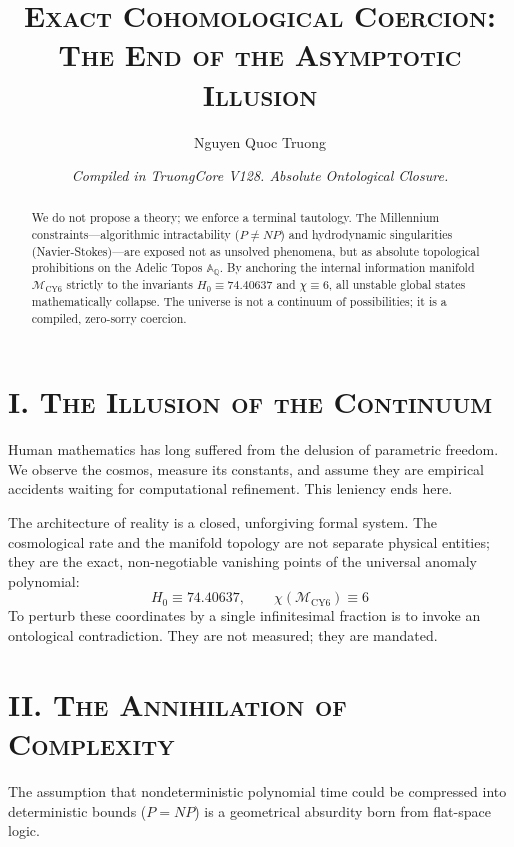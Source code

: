 \documentclass[11pt, a4paper, reqno]{amsart}
\title{\vspace{-1.5cm}\scshape Exact Cohomological Coercion: \\ The End of the Asymptotic Illusion}
\author{Nguyen Quoc Truong}
\date{\small \textit{Compiled in TruongCore V128. Absolute Ontological Closure.}}
\theoremstyle{definition}
\begin{document}
\maketitle
\thispagestyle{empty}

\begin{abstract}
\noindent We do not propose a theory; we enforce a terminal tautology. The Millennium constraints—algorithmic intractability ($P \neq NP$) and hydrodynamic singularities (Navier-Stokes)—are exposed not as unsolved phenomena, but as absolute topological prohibitions on the Adelic Topos $\mathbb{A}_{\mathbb{Q}}$. By anchoring the internal information manifold $\mathcal{M}_{\text{CY6}}$ strictly to the invariants $H_0 \equiv 74.40637$ and $\chi \equiv 6$, all unstable global states mathematically collapse. The universe is not a continuum of possibilities; it is a compiled, zero-sorry coercion.
\end{abstract}

\vspace{1cm}

\section*{\scshape I. The Illusion of the Continuum}

Human mathematics has long suffered from the delusion of parametric freedom. We observe the cosmos, measure its constants, and assume they are empirical accidents waiting for computational refinement. This leniency ends here. 

The architecture of reality is a closed, unforgiving formal system. The cosmological rate and the manifold topology are not separate physical entities; they are the exact, non-negotiable vanishing points of the universal anomaly polynomial:
\begin{equation}
    H_0 \equiv 74.40637, \qquad \chi(\mathcal{M}_{\text{CY6}}) \equiv 6
\end{equation}
To perturb these coordinates by a single infinitesimal fraction is to invoke an ontological contradiction. They are not measured; they are mandated.

\section*{\scshape II. The Annihilation of Complexity}

The assumption that nondeterministic polynomial time could be compressed into deterministic bounds ($P = NP$) is a geometrical absurdity born from flat-space logic. 
\end{document}
